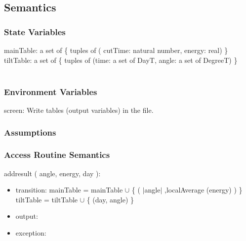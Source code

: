 \documentclass[12pt, titlepage]{article}
\begin{document}
\subsection{Semantics}

\subsubsection{State Variables}

mainTable: a set of \{ tuples of ( 
cutTime: natural number, energy: real) \}\\
tiltTable: a set of \{ tuples of (time: a set of DayT, angle: a set of DegreeT) \}\\\\


\subsubsection{Environment Variables}
screen: Write tables  (output variables) in the file. 

\subsubsection{Assumptions}


\subsubsection{ Access Routine Semantics}

\noindent  addresult ( angle, energy, day ):
\begin{itemize}
\item transition: mainTable = mainTable $\cup$ \{ ( $|$angle$|$ ,localAverage (energy) )  \}\\
tiltTable = tiltTable $\cup$ \{ (day, angle) \}
\item output:
\item exception: 
\end{itemize}
\end{document}
